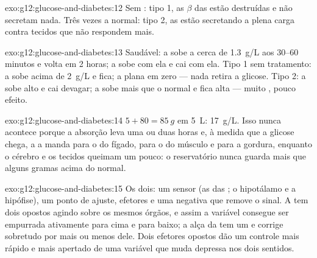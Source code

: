 \begin{solution}{exo:g12:glucose-and-diabetes:12}
Sem : tipo 1, as  $\beta$ das  estão destruídas e
não secretam nada. Três vezes a  normal: tipo 2, as 
estão secretando a plena carga contra tecidos que não respondem mais.
\end{solution}

\begin{solution}{exo:g12:glucose-and-diabetes:13}
Saudável: a  sobe a cerca de \qty{1.3}{g/L} aos 30--60 minutos
e volta em 2 horas; a  sobe com ela e cai com ela. Tipo 1 sem
tratamento: a  sobe acima de \qty{2}{g/L} e fica; a 
plana em zero --- nada retira a glicose. Tipo 2: a  sobe alto e
cai devagar; a  sobe mais que o normal e fica alta --- muito
, pouco efeito.
\end{solution}

\begin{solution}{exo:g12:glucose-and-diabetes:14}
$5 + 80 = \qty{85}{g}$ em \qty{5}{L}: \qty{17}{g/L}. Isso nunca
acontece porque a absorção leva uma ou duas horas e, à medida que a
glicose chega, a  a manda para o  do fígado, para o
 do músculo e para a gordura, enquanto o cérebro e os tecidos
queimam um pouco: o reservatório nunca guarda mais que alguns gramas
acima do normal.
\end{solution}

\begin{solution}{exo:g12:glucose-and-diabetes:15}
Os dois: um sensor (as  das ; o hipotálamo e a hipófise),
um ponto de ajuste, efetores e uma  negativa que remove
o sinal. A  tem dois  opostos agindo sobre os mesmos
órgãos, e assim a variável consegue ser empurrada ativamente para cima
e para baixo; a alça da  tem um  e corrige
sobretudo por mais ou menos dele. Dois efetores opostos dão um controle
mais rápido e mais apertado de uma variável que muda depressa nos dois sentidos.
\end{solution}

